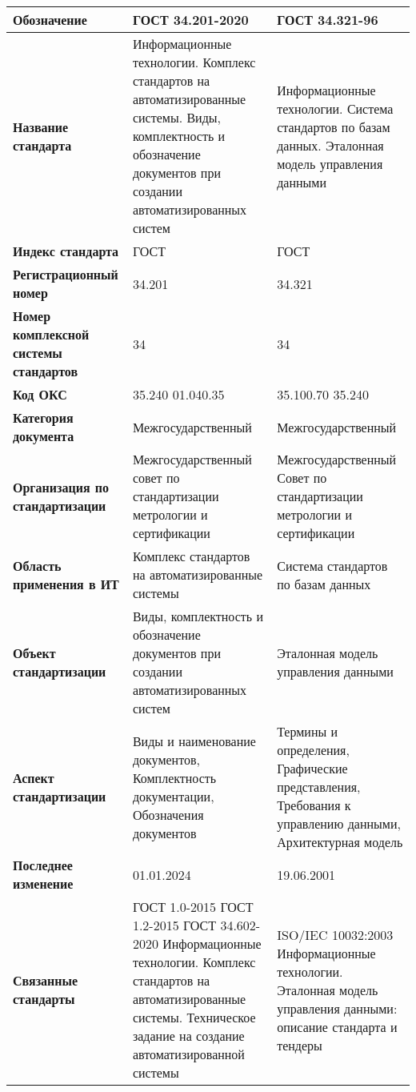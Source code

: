 \begin{table}[h!tp]
	\small
	\centering
	\caption{}
	\label{table:interstate}
	\begin{tabular}{|p{10em}|p{14em}|p{14em}|}
		\hline
		\textbf{Обозначение}
			& \textbf{ГОСТ 34.201-2020} & \textbf{ГОСТ 34.321-96} \\ \hline
		\textbf{Название стандарта}
			& Информационные технологии. Комплекс стандартов на автоматизированные системы. Виды, комплектность и обозначение документов при создании автоматизированных систем
			& Информационные технологии. Система стандартов по базам данных. Эталонная модель управления данными \\ \hline
		\textbf{Индекс стандарта} & ГОСТ & ГОСТ \\ \hline
		\textbf{Регистрационный номер} & 34.201 & 34.321 \\ \hline
		\textbf{Номер комплексной системы стандартов} & 34 & 34 \\ \hline
		\textbf{Код ОКС} & 35.240 01.040.35 & 35.100.70 35.240 \\ \hline
		\textbf{Категория документа}
			& Межгосударственный & Межгосударственный \\ \hline
		\textbf{Организация по стандартизации}
			& Межгосударственный совет по стандартизации метрологии и сертификации
			& Межгосударственный Совет по стандартизации метрологии и сертификации \\ \hline
		\textbf{Область применения в ИТ}
			& Комплекс стандартов на автоматизированные системы
			& Система стандартов по базам данных \\ \hline
		\textbf{Объект стандартизации}
			& Виды, комплектность и обозначение документов при создании автоматизированных систем
			& Эталонная модель управления данными \\ \hline
		\textbf{Аспект стандартизации}
			& Виды и наименование документов, Комплектность документации, Обозначения документов
			& Термины и определения, Графические представления, Требования к управлению данными, Архитектурная модель \\ \hline
		\textbf{Последнее изменение} & 01.01.2024 & 19.06.2001 \\ \hline
		\textbf{Связанные стандарты}
			& ГОСТ 1.0-2015  ГОСТ 1.2-2015  ГОСТ 34.602-2020 Информационные технологии. Комплекс стандартов на автоматизированные системы. Техническое задание на создание автоматизированной системы
			& ISO/IEC 10032:2003 Информационные технологии. Эталонная модель управления данными: описание стандарта и тендеры \\ \hline
	\end{tabular}
\end{table}

